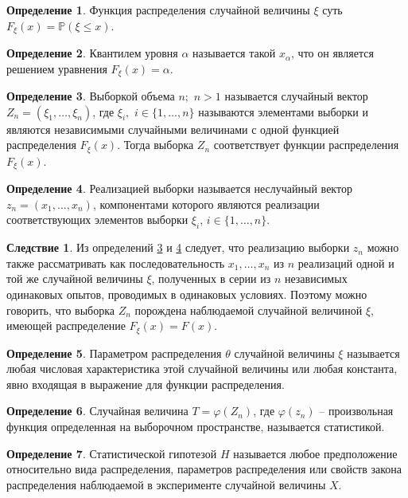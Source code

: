 \documentclass[12pt]{article}
\theoremstyle{definition}
\newtheorem{definition}{Определение}
\newtheorem{consequence}{Следствие}[subsection]
\newcommand{\prob}{\mathbb{P}}
\begin{document}
\begin{definition}
    Функция распределения случайной величины $\xi$ суть $F_\xi(x)=\prob(\xi\leq x)$.
\end{definition}
\begin{definition}
    Квантилем уровня $\alpha$ называется такой $x_\alpha$, что он является решением уравнения $F_\xi(x)=\alpha$.
\end{definition}
\begin{definition}\label{выборка}
    Выборкой объема $n;\,\,n>1$ называется случайный вектор $Z_n=(\xi_1,\ldots,\xi_n)$, где $\xi_i,\,\,i\in\{1,\ldots,n\}$ называются элементами выборки и являются независимыми случайными величинами с одной функцией распределения $F_\xi(x)$. Тогда выборка $Z_n$ соответствует функции распределения $F_\xi(x)$.
\end{definition}
\begin{definition}\label{реализация выборки}
    Реализацией выборки называется неслучайный вектор $z_n=(x_1,\ldots,x_n)$, компонентами которого являются реализации соответствующих элементов выборки $\xi_i$, $i\in\{1,\ldots,n\}$.
\end{definition}
\begin{consequence}
    Из определений \ref{выборка} и \ref{реализация выборки} следует, что реализацию выборки $z_n$ можно также рассматривать как последовательность $x_1,\ldots,x_n$ из $n$ реализаций одной и той же случайной величины $\xi$, полученных в серии из $n$ независимых одинаковых опытов, проводимых в одинаковых условиях. Поэтому можно говорить, что выборка $Z_n$ порождена наблюдаемой случайной величиной $\xi$, имеющей распределение $F_\xi(x)=F(x)$.
\end{consequence}
\begin{definition}
    Параметром распределения $\theta$ случайной величины $\xi$ называется любая числовая характеристика этой случайной величины или любая константа, явно входящая в выражение для функции распределения.
\end{definition}
\begin{definition}
    Случайная величина $T=\varphi(Z_n)$, где $\varphi(z_n)$ – произвольная функция определенная на выборочном пространстве, называется статистикой.
\end{definition}
\begin{definition}
    Статистической гипотезой $H$ называется любое предположение относительно вида распределения, параметров распределения или свойств закона распределения наблюдаемой в эксперименте случайной величины $X$.
\end{definition}
\end{document}
